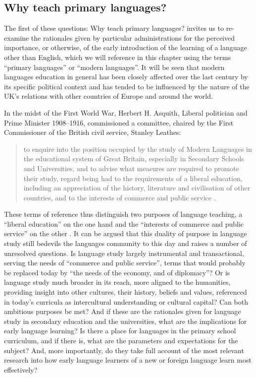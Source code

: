 \documentclass[output=paper]{langscibook}
\begin{document}
\subsection{Why teach primary languages?}

The first of these questions: Why teach primary languages? invites us to re-examine the rationales given by particular administrations for the perceived importance, or otherwise, of the early introduction of the learning of a language other than English, which we will reference in this chapter using the terms ``primary languages'' or ``modern languages''. It will be seen that modern languages education in general has been closely affected over the last century by its specific political context and has tended to be influenced by the nature of the UK’s relations with other countries of Europe and around the world.



In the midst of the First World War, Herbert H. Asquith, Liberal politician and Prime Minister 1908--1916, commissioned a committee, chaired by the First Commissioner of the British civil service, Stanley Leathes: 


\begin{quote}
to enquire into the position occupied by the study of Modern Languages in the educational system of Great Britain, especially in Secondary Schools and Universities, and to advise what measures are required to promote their study, regard being had to the requirements of a liberal education, including an appreciation of the history, literature and civilisation of other countries, and to the interests of commerce and public service \citep[1]{Leathes1918}.
\end{quote}


These terms of reference thus distinguish two purposes of language teaching, a ``liberal education'' on the one hand and the ``interests of commerce and public service'' on the other \citep{Byram2014}. It can be argued that this duality of purpose in language study still bedevils the languages community to this day and raises a number of unresolved questions. Is language study largely instrumental and transactional, serving the needs of ``commerce and public service'', terms that would probably be replaced today by ``the needs of the economy, and of diplomacy''? Or is language study much broader in its reach, more aligned to the humanities, providing insight into other cultures, their history, beliefs and values, referenced in today’s curricula as intercultural understanding or cultural capital? Can both ambitious purposes be met? And if these are the rationales given for language study in secondary education and the universities, what are the implications for early language learning? Is there a place for languages in the primary school curriculum, and if there is, what are the parameters and expectations for the subject? And, more importantly, do they take full account of the most relevant research into how early language learners of a new or foreign language learn most effectively?
\end{document}
